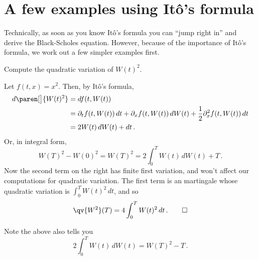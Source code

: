 \section{A few examples using It\^o's formula}

Technically, as soon as you know It\^o's formula you can ``jump right in'' and derive the Black-Scholes equation.
However, because of the importance of It\^o's formula, we work out a few simpler examples first.

\begin{example}
  Compute the quadratic variation of $W(t)^2$.
\end{example}
\begin{sol}
  Let $f(t, x) = x^2$.
  Then, by It\^o's formula,
  \begin{align*}
    d \paren[\big]{ W(t)^2 }
      &= d f(t, W(t))
    \\
      &= \partial_t f( t, W(t)) \, dt + \partial_x f (t, W(t)) \, dW(t)
	+ \frac{1}{2} \partial_x^2 f(t, W(t)) \, dt
    \\
      &= 2 W(t) \, dW(t) + dt\,.
  \end{align*}
  Or, in integral form,
  \begin{equation*}
    W(T)^2 - W(0)^2
      = W(T)^2
      = 2 \int_0^T W(t) \, dW(t) + T\,.
  \end{equation*}
  Now the second term on the right has finite first variation, and won't affect our computations for quadratic variation.
  The first term is an martingale whose quadratic variation is $\int_0^T W(t)^2 \, dt$, and so
  \begin{equation*}
    \qv{W^2}(T) = 4 \int_0^T W(t)^2 \, dt \,.
    \qedhere
  \end{equation*}
\end{sol}
\begin{remark}
  Note the above also tells you
  \begin{equation*}
    2 \int_0^T W(t) \, dW(t) = W(T)^2 - T \,.
  \end{equation*}
\end{remark}


